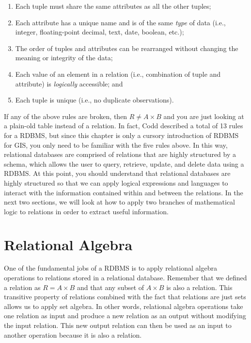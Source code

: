 \documentclass[
]{book}
\providecommand{\tightlist}{%
  \setlength{\itemsep}{0pt}\setlength{\parskip}{0pt}}
\begin{document}
\begin{enumerate}
\def\labelenumi{\arabic{enumi}.}
\tightlist
\item
  Each tuple must share the same attributes as all the other tuples;
\item
  Each attribute has a unique name and is of the same \emph{type} of data (i.e., integer, floating-point decimal, text, date, boolean, etc.);
\item
  The order of tuples and attributes can be rearranged without changing the meaning or integrity of the data;
\item
  Each value of an element in a relation (i.e., combination of tuple and attribute) is \emph{logically} accessible; and
\item
  Each tuple is unique (i.e., no duplicate observations).
\end{enumerate}

If any of the above rules are broken, then \(R≠A×B\) and you are just looking at a plain-old table instead of a relation. In fact, Codd described a total of 13 rules for a RDBMS, but since this chapter is only a cursory introduction of RDBMS for GIS, you only need to be familiar with the five rules above. In this way, relational databases are comprised of relations that are highly structured by a schema, which allows the user to query, retrieve, update, and delete data using a RDBMS. At this point, you should understand that relational databases are highly structured so that we can apply logical expressions and languages to interact with the information contained within and between the relations. In the next two sections, we will look at how to apply two branches of mathematical logic to relations in order to extract useful information.

\hypertarget{relational-algebra}{%
\section{Relational Algebra}\label{relational-algebra}}

One of the fundamental jobs of a RDBMS is to apply relational algebra operations to relations stored in a relational database. Remember that we defined a relation as \(R=A×B\) and that any subset of \(A×B\) is also a relation. This transitive property of relations combined with the fact that relations are just sets allows us to apply set algebra. In other words, relational algebra operations take one relation as input and produce a new relation as an output without modifying the input relation. This new output relation can then be used as an input to another operation because it is also a relation.
\end{document}
